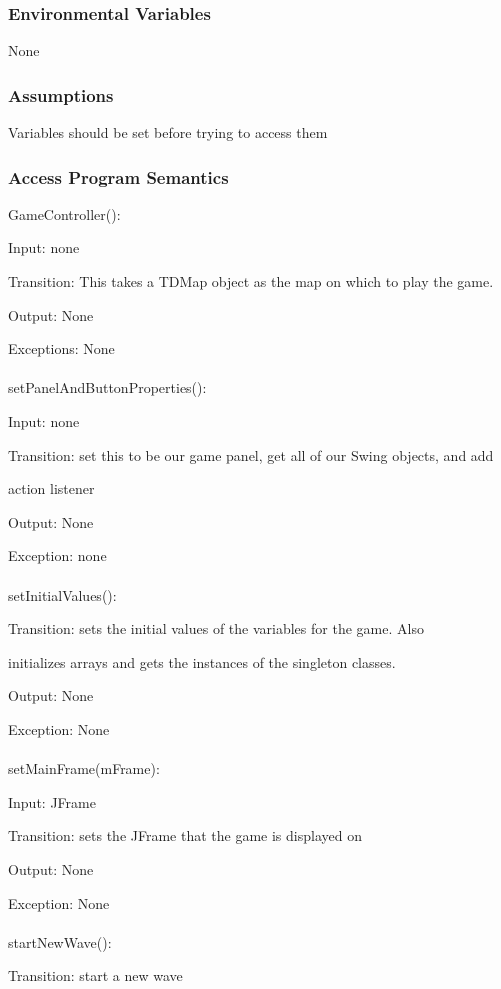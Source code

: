 \documentclass[12,english]{article}
\begin{document}
	   
		\subsubsection{Environmental Variables}
		None
		\subsubsection{Assumptions}
		Variables should be set before trying to access them
		
		\subsubsection{Access Program Semantics}
		
		GameController():
		
		Input: none
		
		Transition: This takes a TDMap object as the map on which to play the game.
		
		Output: None
		
		Exceptions: None\\
		\\
		setPanelAndButtonProperties():
		
		Input: none
		
		Transition: set this to be our game panel, get all of our Swing objects, and add
		
		action listener
		
		Output: None
		
		Exception: none\\ 
		\\
		setInitialValues():
		
		Transition: sets the initial values of the variables for the game. Also
		
		initializes arrays and gets the instances of the singleton classes.
		
		Output: None
		
		Exception: None\\ 
		\\
		setMainFrame(mFrame):
		
		Input: JFrame
		
		Transition: sets the JFrame that the game is displayed on
		
		Output: None
		
		Exception: None\\
		\\
		startNewWave():
		
		Transition: start a new wave
		
\end{document}
